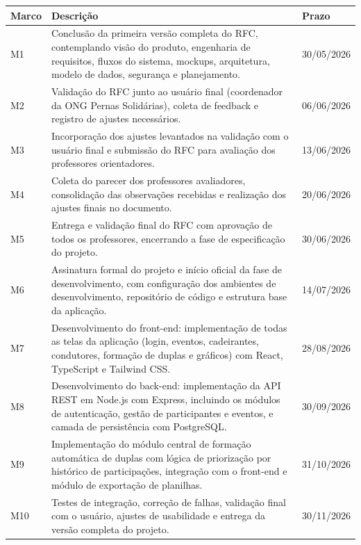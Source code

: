 \documentclass[12pt,a4paper]{article}
\begin{document}
\begin{center}
\begin{tabular}{p{} p{} p{}}
\toprule
\textbf{Marco} & \textbf{Descrição} & \textbf{Prazo} \\
\midrule
M1 & Conclusão da primeira versão completa do RFC, contemplando visão do produto, engenharia de requisitos, fluxos do sistema, mockups, arquitetura, modelo de dados, segurança e planejamento. & 30/05/2026 \\
\midrule
M2 & Validação do RFC junto ao usuário final (coordenador da ONG Pernas Solidárias), coleta de feedback e registro de ajustes necessários. & 06/06/2026 \\
\midrule
M3 & Incorporação dos ajustes levantados na validação com o usuário final e submissão do RFC para avaliação dos professores orientadores. & 13/06/2026 \\
\midrule
M4 & Coleta do parecer dos professores avaliadores, consolidação das observações recebidas e realização dos ajustes finais no documento. & 20/06/2026 \\
\midrule
M5 & Entrega e validação final do RFC com aprovação de todos os professores, encerrando a fase de especificação do projeto. & 30/06/2026 \\
\midrule
M6 & Assinatura formal do projeto e início oficial da fase de desenvolvimento, com configuração dos ambientes de desenvolvimento, repositório de código e estrutura base da aplicação. & 14/07/2026 \\
\midrule
M7 & Desenvolvimento do front-end: implementação de todas as telas da aplicação (login, eventos, cadeirantes, condutores, formação de duplas e gráficos) com React, TypeScript e Tailwind CSS. & 28/08/2026 \\
\midrule
M8 & Desenvolvimento do back-end: implementação da API REST em Node.js com Express, incluindo os módulos de autenticação, gestão de participantes e eventos, e camada de persistência com PostgreSQL. & 30/09/2026 \\
\midrule
M9 & Implementação do módulo central de formação automática de duplas com lógica de priorização por histórico de participações, integração com o front-end e módulo de exportação de planilhas. & 31/10/2026 \\
\midrule
M10 & Testes de integração, correção de falhas, validação final com o usuário, ajustes de usabilidade e entrega da versão completa do projeto. & 30/11/2026 \\
\bottomrule
\end{tabular}
\end{center}
\end{document}
